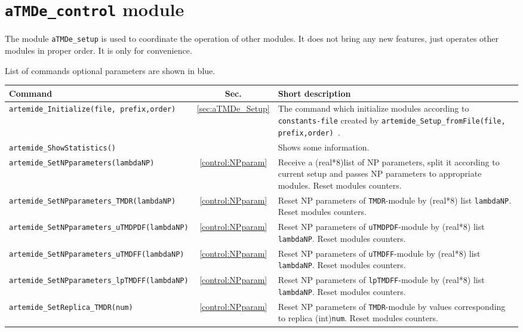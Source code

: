 \documentclass[prd,nofootinbib,eqsecnum,final]{revtex4}
\renewcommand{\(}{\left(}
\renewcommand{\)}{\right)}
\renewcommand{\[}{\left[}
\renewcommand{\]}{\right]}
\newcommand{\blue}[1]{{\color{blue} #1}}
\begin{document}
\newpage

\section{\texttt{aTMDe\_control} module}
\label{aTMDe_control}

The module \texttt{aTMDe\_setup} is used to coordinate the operation of other modules. It does not bring any new features, just operates other modules in proper order. It is only for convenience.

\begin{center}
List of commands \blue{optional parameters are shown in blue.}
\\
\begin{longtable}{||p{7cm}|c|p{10cm}||}
\hline\hline
Command & Sec. & Short description
\\\hline
\texttt{artemide\_Initialize(file,\blue{prefix,order}) } & \ref{sec:aTMDe_Setup} &  The command which initialize modules according to \texttt{constants-file} created by  \texttt{artemide\_Setup\_fromFile(file,\blue{prefix,order}) }.
\\\hline
\texttt{artemide\_ShowStatistics()} & & Shows some information.
\\\hline
\texttt{artemide\_SetNPparameters(lambdaNP)} &\ref{control:NPparam} & Receive a (real*8)list of NP parameters, split it according to current setup and passes NP parameters to appropriate modules. Reset modules counters.
\\\hline
\texttt{artemide\_SetNPparameters\_TMDR(lambdaNP)} &\ref{control:NPparam} & Reset NP parameters of \texttt{TMDR}-module by (real*8) list \texttt{lambdaNP}. Reset modules counters.
\\\hline
\texttt{artemide\_SetNPparameters\_uTMDPDF(lambdaNP)} &\ref{control:NPparam} & Reset NP parameters of \texttt{uTMDPDF}-module by (real*8) list \texttt{lambdaNP}. Reset modules counters.
\\\hline
\texttt{artemide\_SetNPparameters\_uTMDFF(lambdaNP)} &\ref{control:NPparam} & Reset NP parameters of \texttt{uTMDFF}-module by (real*8) list \texttt{lambdaNP}. Reset modules counters.
\\\hline
\texttt{artemide\_SetNPparameters\_lpTMDFF(lambdaNP)} &\ref{control:NPparam} & Reset NP parameters of \texttt{lpTMDFF}-module by (real*8) list \texttt{lambdaNP}. Reset modules counters.
\\\hline
\texttt{artemide\_SetReplica\_TMDR(num)} &\ref{control:NPparam} & Reset NP parameters of \texttt{TMDR}-module by values corresponding to replica (int)\texttt{num}. Reset modules counters.

\end{longtable}
\end{center}
\end{document}
